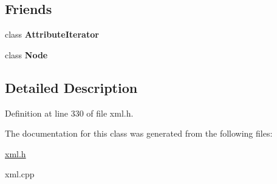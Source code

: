 \subsection*{Friends}
\begin{DoxyCompactItemize}
\item 
\hypertarget{classphys_1_1xml_1_1Attribute_a1ed8790083a80b2604beba1c666bce6e}{
class {\bfseries AttributeIterator}}
\label{da/ddf/classphys_1_1xml_1_1Attribute_a1ed8790083a80b2604beba1c666bce6e}

\item 
\hypertarget{classphys_1_1xml_1_1Attribute_a6db9d28bd448a131448276ee03de1e6d}{
class {\bfseries Node}}
\label{da/ddf/classphys_1_1xml_1_1Attribute_a6db9d28bd448a131448276ee03de1e6d}

\end{DoxyCompactItemize}


\subsection{Detailed Description}


Definition at line 330 of file xml.h.



The documentation for this class was generated from the following files:\begin{DoxyCompactItemize}
\item 
\hyperlink{xml_8h}{xml.h}\item 
xml.cpp\end{DoxyCompactItemize}
